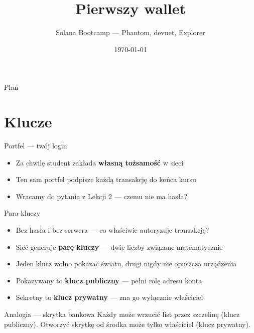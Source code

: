 

\usepackage[utf8]{inputenc}
\usepackage[T1]{fontenc}

\title{Pierwszy wallet}
\subtitle{Solana Bootcamp --- Phantom, devnet, Explorer}
\author{}
\date{\today}



\maketitleframe

\begin{frame}{Plan}
  \tableofcontents
\end{frame}

\section{Klucze}

\begin{frame}{Portfel --- twój login}
  \begin{itemize}
    \item Za chwilę student zakłada \textbf{własną tożsamość} w sieci
    \item Ten sam portfel podpisze każdą transakcję do końca kursu
    \item Wracamy do pytania z Lekcji 2 --- czemu nie ma hasła?
  \end{itemize}
\end{frame}

\begin{frame}{Para kluczy}
  \begin{itemize}
    \item Bez hasła i bez serwera --- co właściwie autoryzuje transakcję?
    \item Sieć generuje \textbf{parę kluczy} --- dwie liczby związane matematycznie
    \item Jeden klucz wolno pokazać światu, drugi nigdy nie opuszcza urządzenia
    \item Pokazywany to \textbf{klucz publiczny} --- pełni rolę adresu konta
    \item Sekretny to \textbf{klucz prywatny} --- zna go wyłącznie właściciel
  \end{itemize}
  \vspace{0.25cm}
  \begin{exampleblock}{Analogia --- skrytka bankowa}
    Każdy może wrzucić list przez szczelinę (klucz publiczny).
    Otworzyć skrytkę od środka może tylko właściciel (klucz prywatny).
  \end{exampleblock}
\end{frame}

